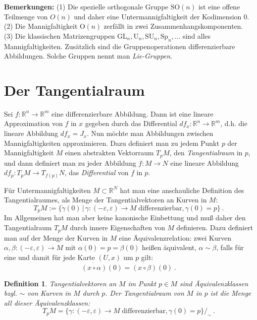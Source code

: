 \documentclass[12pt,a4paper]{article}
\def\R{\mathbb{R}}
\def\O{\mathrm{O}}
\def\SO{\mathrm{SO}}
\def\SU{\mathrm{SU}}
\def\Sp{\mathrm{Sp}}
\def\GL{\mathrm{GL}}
\def\U{\mathrm{U}}
\newtheorem{Definition}[Lemma]{Definition}
\begin{document}
\bigskip

{\bf Bemerkungen:}
(1) Die spezielle orthogonale Gruppe $\SO(n)$ ist eine offene Teilmenge von $O(n)$ und daher eine Untermannigfaltigkeit
der Kodimension 0. (2) Die Mannigfaltigkeit $\O(n)$ zerf\"allt in zwei Zusammenhangskomponenten. (3)
Die klassischen Matrizengruppen $\GL_n, \U_n, \SU_n, \Sp_n,\ldots$ sind alles Mannigfaltigkeiten. Zus\"atzlich
sind die Gruppenoperationen differenzierbare Abbildungen. Solche Gruppen nennt man {\it Lie-Gruppen}.

\bigskip


\section{Der Tangentialraum}

Sei $f:\R^n\rightarrow \R^m$ eine differenzierbare Abbildung. Dann ist eine lineare Approximation von $f$ in $x$
gegeben durch das Differential $df_x:\R^n\rightarrow \R^m$, d.h. die lineare Abbildung $df_x=J_x$. Nun m\"ochte man
Abbildungen zwischen Mannigfaltigkeiten approximieren. Dazu definiert man zu jedem Punkt $p$
der Mannigfaltigkeit $M$ einen abstrakten Vektorraum $T_pM$, den {\it Tangentialraum} in $p$, und dann definiert man zu
jeder Abbildung $f:M\rightarrow N$ eine lineare Abbildung $df_p : T_pM \rightarrow T_{f(p)}N$, das {\it Differential}
von $f$ in $p$.

\medskip

F\"ur Untermannigfaltigkeiten $M\subset \R^N$ hat man eine anschauliche Definition des Tangentialraumes,
als Menge der Tangentialvektoren an Kurven in $M$:
$$
T_pM :=\{ \dot \gamma (0) \, |\, \gamma : (-\varepsilon,\varepsilon)\rightarrow M \; \mbox{differenzierbar}, \gamma (0) = p\} \ .
$$
Im Allgemeinen hat man aber keine kanonische Einbettung und mu\ss{} daher den Tangentialraum $T_pM$ durch innere
Eigenschaften von $M$ definieren. Dazu definiert man auf der Menge der Kurven in $M$ eine \"Aquivalenzrelation:
zwei Kurven $\alpha, \beta : (-\varepsilon,\varepsilon)\rightarrow M$ mit $\alpha(0)=p=\beta(0)$ hei\ss en \"aquivalent,
$\alpha \sim \beta$, falls f\"ur eine und damit f\"ur jede Karte $(U,x)$ um $p$ gilt:
$$
\dot{(x\circ \alpha)}(0) = \dot{(x\circ \beta)}(0) \ .
$$

\begin{Definition}
{\em Tangentialvektoren} an $M$ im Punkt $p\in M$ sind \"Aquivalenzklassen bzgl. $\sim$ von Kurven in $M$ durch $p$. Der
{\em Tangentialraum} von $M$ in $p$ ist die Menge all dieser \"Aquivalenzklassen:
$$
T_pM = \{\gamma: (-\varepsilon,\varepsilon)\rightarrow M \; \mbox{differenzierbar}, \gamma (0) = p\}/_\sim \ .
$$
\end{Definition}
\end{document}
